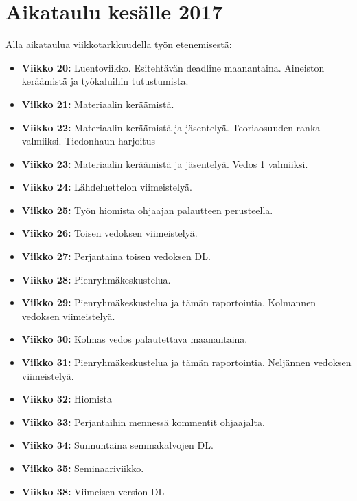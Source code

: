 \documentclass[finnish,12pt,a4paper,pdftex,elec,utf8]{aaltothesis}
\begin{document}
\section{Aikataulu kesälle 2017}
Alla aikataulua viikkotarkkuudella työn etenemisestä:
\begin{itemize}
    \item \textbf{Viikko 20:} Luentoviikko. Esitehtävän deadline maanantaina. Aineiston keräämistä ja työkaluihin tutustumista.
    \item \textbf{Viikko 21:} Materiaalin keräämistä.
    \item \textbf{Viikko 22:} Materiaalin keräämistä ja jäsentelyä. Teoriaosuuden ranka valmiiksi. Tiedonhaun harjoitus
    \item \textbf{Viikko 23:} Materiaalin keräämistä ja jäsentelyä. Vedos 1 valmiiksi.
    \item \textbf{Viikko 24:} Lähdeluettelon viimeistelyä.
    \item \textbf{Viikko 25:} Työn hiomista ohjaajan palautteen perusteella.
    \item \textbf{Viikko 26:} Toisen vedoksen viimeistelyä.
    \item \textbf{Viikko 27:} Perjantaina toisen vedoksen DL.
    \item \textbf{Viikko 28:} Pienryhmäkeskustelua.
    \item \textbf{Viikko 29:} Pienryhmäkeskustelua ja tämän raportointia. Kolmannen vedoksen viimeistelyä.
    \item \textbf{Viikko 30:} Kolmas vedos palautettava maanantaina.
    \item \textbf{Viikko 31:} Pienryhmäkeskustelua ja tämän raportointia. Neljännen vedoksen viimeistelyä.
    \item \textbf{Viikko 32:} Hiomista
    \item \textbf{Viikko 33:} Perjantaihin mennessä kommentit ohjaajalta.
    \item \textbf{Viikko 34:} Sunnuntaina semmakalvojen DL.
    \item \textbf{Viikko 35:} Seminaariviikko.
    \item \textbf{Viikko 38:} Viimeisen version DL

















\end{itemize}
\clearpage

\nocite{*}


\end{document}
